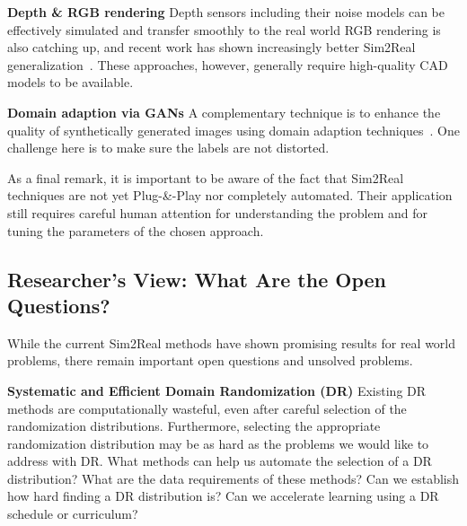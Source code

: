 

{\bf Depth \& RGB rendering} %
Depth sensors including their noise models can be effectively simulated and transfer smoothly to the real world 
RGB rendering is also catching up, and recent work has shown increasingly better Sim2Real generalization~\cite{mahler_learning_2019}. %
These approaches, however, generally require high-quality CAD models to be available.


{\bf Domain adaption via GANs} A complementary technique is to enhance the quality of synthetically generated images using domain adaption techniques~\cite{zhu2020unpaired}. One challenge here is to make sure the labels are not distorted.

As a final remark, it is important to be aware of the fact that Sim2Real techniques are not yet Plug-\&-Play nor completely automated. Their application still requires careful human attention for understanding the problem and for tuning the parameters of the chosen approach.

\subsection{Researcher’s View: What Are the Open Questions?}

While the current Sim2Real methods have shown promising results for real world problems, there remain important open questions and unsolved problems. 

{\bf Systematic and Efficient Domain Randomization (DR)} Existing DR methods are computationally wasteful, even after careful selection of the randomization distributions. Furthermore, selecting the appropriate randomization distribution may be as hard as the problems we would like to address with DR. What methods can help us automate the selection of a DR distribution? What are the data requirements of these methods? Can we establish how hard finding a DR distribution is? Can we accelerate learning using a DR schedule or curriculum?

